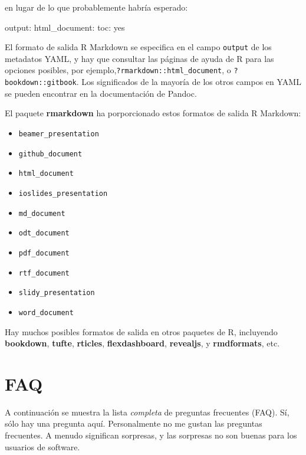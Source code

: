 \documentclass[12pt,]{krantz}
\makeatletter
\newenvironment{Shaded}{\begin{snugshade}}{\end{snugshade}}
\newcommand{\FunctionTok}[1]{\textcolor[rgb]{0.00,0.00,0.00}{{#1}}}
\newcommand{\NormalTok}[1]{{#1}}
\providecommand{\tightlist}{%
  \setlength{\itemsep}{0pt}\setlength{\parskip}{0pt}}
\newenvironment{kframe}{%
\medskip{}
\setlength{\fboxsep}{.8em}
 \def\at@end@of@kframe{}%
 \ifinner\ifhmode%
  \def\at@end@of@kframe{\end{minipage}}%
  \begin{minipage}{\columnwidth}%
 \fi\fi%
 \def\FrameCommand##1{\hskip\@totalleftmargin \hskip-\fboxsep
 \colorbox{shadecolor}{##1}\hskip-\fboxsep
     \hskip-\linewidth \hskip-\@totalleftmargin \hskip\columnwidth}%
 \MakeFramed {\advance\hsize-\width
   \@totalleftmargin\z@ \linewidth\hsize
   \@setminipage}}%
 {\par\unskip\endMakeFramed%
 \at@end@of@kframe}
\renewenvironment{Shaded}{\begin{kframe}}{\end{kframe}}
\theoremstyle{definition}
\theoremstyle{definition}
\theoremstyle{remark}
\makeatother
\begin{document}
en lugar de lo que probablemente habría esperado:

\begin{Shaded}
\begin{Highlighting}[]
\FunctionTok{output:}
  \FunctionTok{html_document:}
    \FunctionTok{toc:} \NormalTok{yes}
\end{Highlighting}
\end{Shaded}

El formato de salida R Markdown se especifica en el campo
\texttt{output} de los metadatos YAML, y hay que consultar las páginas
de ayuda de R para las opciones posibles, por
ejemplo,\texttt{?rmarkdown::html\_document}, o
\texttt{?bookdown::gitbook}. Los significados de la mayoría de los otros
campos en YAML se pueden encontrar en la documentación de Pandoc.

El paquete \textbf{rmarkdown} ha porporcionado estos formatos de salida
R Markdown:

\begin{itemize}
\tightlist
\item
  \texttt{beamer\_presentation}
\item
  \texttt{github\_document}
\item
  \texttt{html\_document}
\item
  \texttt{ioslides\_presentation}
\item
  \texttt{md\_document}
\item
  \texttt{odt\_document}
\item
  \texttt{pdf\_document}
\item
  \texttt{rtf\_document}
\item
  \texttt{slidy\_presentation}
\item
  \texttt{word\_document}
\end{itemize}

Hay muchos posibles formatos de salida en otros paquetes de R,
incluyendo \textbf{bookdown}, \textbf{tufte}, \textbf{rticles},
\textbf{flexdashboard}, \textbf{revealjs}, y \textbf{rmdformats}, etc.

\chapter{FAQ}\label{faq}

A continuación se muestra la lista \emph{completa} de preguntas
frecuentes (FAQ). Sí, sólo hay una pregunta aquí. Personalmente no me
gustan las preguntas frecuentes. A menudo significan sorpresas, y las
sorpresas no son buenas para los usuarios de software.
\end{document}
